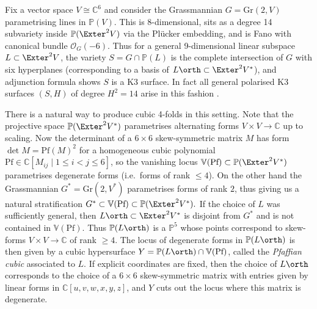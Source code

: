 \begin{example}
    Fix a vector space \(V\cong \mathbb{C}^6\) and consider the Grassmannian
    \(G=\text{Gr}(2,V)\) parametrising lines in \(\mathbb{P}(V)\). This is
    8-dimensional, sits as a degree 14 subvariety inside
    \(\mathbb{P}(\Exter^2V)\) via the Pl\"ucker embedding, and is Fano with
    canonical bundle \(\mathscr{O}_G(-6)\). Thus for a general 9-dimensional
    linear subspace \(L\subset \Exter^2V\), the variety \(S=G\cap
    \mathbb{P}(L)\) is the complete intersection of \(G\) with six hyperplanes
    (corresponding to a basis of \(L\orth\subset \Exter^2V^\ast\)), and
    adjunction formula shows \(S\) is a K3 surface. In fact all general
    polarised K3 surfaces \((S,H)\) of degree \(H^2=14\) arise in this fashion
    \cite[see][\S 3]{mukaiCurvesK3Surfaces}.

    There is a natural way to produce cubic 4-folds in this setting. Note that
    the projective space \(\mathbb{P}(\Exter^2V^\ast)\) parametrises alternating
    forms \(V\times V\to \mathbb{C}\) up to scaling. Now the
    determinant of a \(6\times6\) skew-symmetric matrix \(M\) has form
    \(\det M = \text{Pf}(M)^2\) for a homogeneous cubic polynomial
    \(\text{Pf}\in \mathbb{C}[M_{ij}\;|\; 1\leq i<j\leq 6]\), so the vanishing
    locus \(\mathbb{V}(\text{Pf})\subset \mathbb{P}(\Exter^2V^\ast)\)
    parametrises degenerate forms (i.e.\ forms of rank \(\leq 4\)). On the other
    hand the Grassmannian \(G^\ast = \text{Gr}(2,V^\ast)\) parametrises forms
    of rank \(2\), thus giving us a natural stratification
    \(G^\ast\subset  \mathbb{V}(\text{Pf}) \subset \mathbb{P}(\Exter^2V^\ast).
    \) If the choice of \(L\) was sufficiently general, then \(L\orth\subset
    \Exter^2V^\ast\) is disjoint from \(G^\ast\) and is not
    contained in \(\mathbb{V}(\text{Pf})\). Thus \(\mathbb{P}(L\orth)\) is a
    \(\mathbb{P}^5\) whose points correspond to skew-forms \(V\times V\to
    \mathbb{C}\) of rank \(\geq 4\). The locus of degenerate forms in
    \(\mathbb{P}(L\orth)\) is then
    given by a cubic hypersurface \(Y=\mathbb{P}(L\orth)\cap
    \mathbb{V}(\text{Pf})\), called the \textit{Pfaffian cubic} associated to
    \(L\). If explicit coordinates are fixed, then the choice of \(L\orth\)
    corresponds to the choice of a \(6\times 6\) skew-symmetric matrix with
    entries given by linear forms in \(\mathbb{C}[u,v,w,x,y,z]\), and \(Y\) cuts
    out the locus where this matrix is degenerate.
\end{example}

